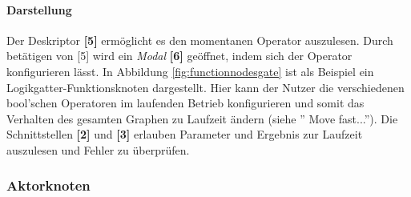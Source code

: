 \paragraph{Darstellung}  Der Deskriptor \textbf{[5]} ermöglicht es den momentanen Operator auszulesen. Durch betätigen von [5] wird ein \textit{Modal} \textbf{[6]} geöffnet, indem sich der Operator konfigurieren lässt. In Abbildung \ref{fig:functionnodesgate} ist als Beispiel ein Logikgatter-Funktionsknoten dargestellt. Hier kann der Nutzer die verschiedenen bool'schen Operatoren im laufenden Betrieb konfigurieren und somit das Verhalten des gesamten Graphen zu Laufzeit ändern (siehe '' Move fast...''). Die Schnittstellen \textbf{[2]} und \textbf{[3]} erlauben Parameter und Ergebnis zur Laufzeit auszulesen und Fehler zu überprüfen.


\subsubsection{Aktorknoten}

